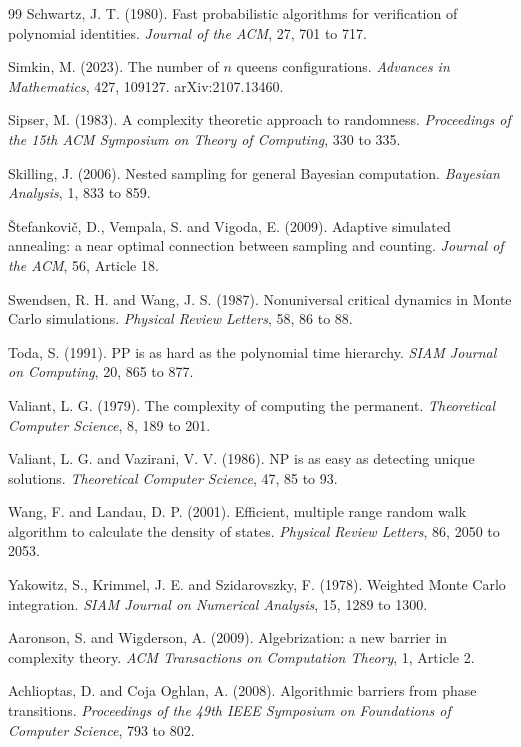 \documentclass[11pt,twoside,openany]{book}
\theoremstyle{plain}
\theoremstyle{definition}
\theoremstyle{remark}
\begin{document}
\begin{thebibliography}{99}
 Schwartz, J. T. (1980). Fast probabilistic algorithms for verification of polynomial identities. \emph{Journal of the ACM}, 27, 701 to 717.

 Simkin, M. (2023). The number of $n$ queens configurations. \emph{Advances in Mathematics}, 427, 109127. arXiv:2107.13460.

 Sipser, M. (1983). A complexity theoretic approach to randomness. \emph{Proceedings of the 15th ACM Symposium on Theory of Computing}, 330 to 335.

 Skilling, J. (2006). Nested sampling for general Bayesian computation. \emph{Bayesian Analysis}, 1, 833 to 859.

 \v{S}tefankovi\v{c}, D., Vempala, S. and Vigoda, E. (2009). Adaptive simulated annealing: a near optimal connection between sampling and counting. \emph{Journal of the ACM}, 56, Article 18.

 Swendsen, R. H. and Wang, J. S. (1987). Nonuniversal critical dynamics in Monte Carlo simulations. \emph{Physical Review Letters}, 58, 86 to 88.

 Toda, S. (1991). PP is as hard as the polynomial time hierarchy. \emph{SIAM Journal on Computing}, 20, 865 to 877.

 Valiant, L. G. (1979). The complexity of computing the permanent. \emph{Theoretical Computer Science}, 8, 189 to 201.

 Valiant, L. G. and Vazirani, V. V. (1986). NP is as easy as detecting unique solutions. \emph{Theoretical Computer Science}, 47, 85 to 93.

 Wang, F. and Landau, D. P. (2001). Efficient, multiple range random walk algorithm to calculate the density of states. \emph{Physical Review Letters}, 86, 2050 to 2053.

 Yakowitz, S., Krimmel, J. E. and Szidarovszky, F. (1978). Weighted Monte Carlo integration. \emph{SIAM Journal on Numerical Analysis}, 15, 1289 to 1300.


 Aaronson, S. and Wigderson, A. (2009). Algebrization: a new barrier in complexity theory. \emph{ACM Transactions on Computation Theory}, 1, Article 2.

 Achlioptas, D. and Coja Oghlan, A. (2008). Algorithmic barriers from phase transitions. \emph{Proceedings of the 49th IEEE Symposium on Foundations of Computer Science}, 793 to 802.


\end{thebibliography}
\end{document}
